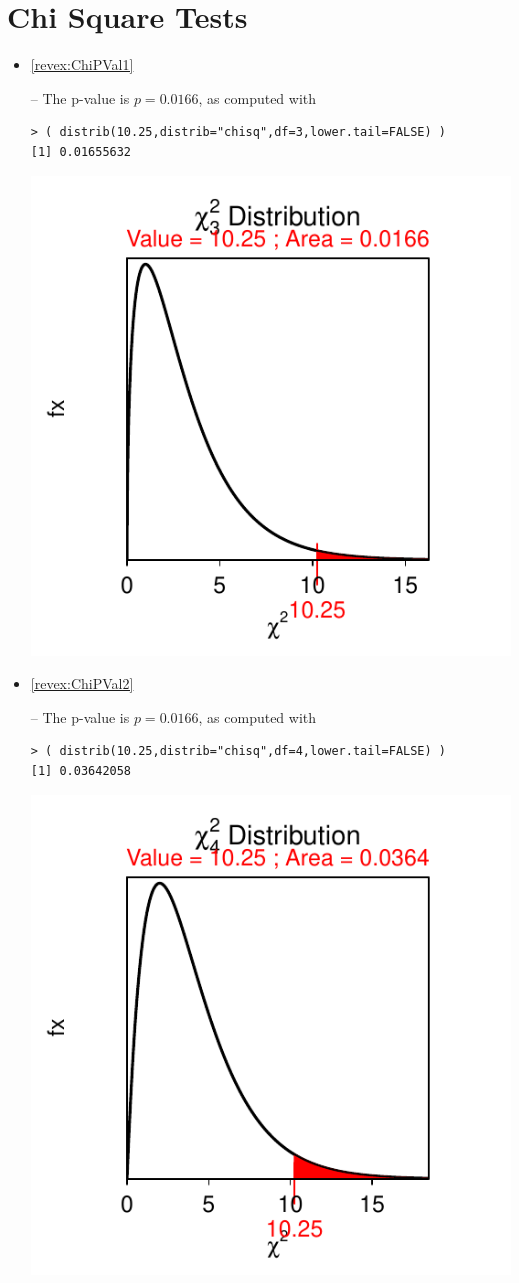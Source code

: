\documentclass[10pt,openany]{book}\usepackage[]{graphicx}\usepackage[]{color}
\makeatletter
\newenvironment{kframe}{%
 \def\at@end@of@kframe{}%
 \ifinner\ifhmode%
  \def\at@end@of@kframe{\end{minipage}}%
  \begin{minipage}{\columnwidth}%
 \fi\fi%
 \def\FrameCommand##1{\hskip\@totalleftmargin \hskip-\fboxsep
 \colorbox{shadecolor}{##1}\hskip-\fboxsep
     \hskip-\linewidth \hskip-\@totalleftmargin \hskip\columnwidth}%
 \MakeFramed {\advance\hsize-\width
   \@totalleftmargin\z@ \linewidth\hsize
   \@setminipage}}%
 {\par\unskip\endMakeFramed%
 \at@end@of@kframe}
\newenvironment{knitrout}{}{} %
\makeatother
\begin{document}
\section*{Chi Square Tests}
\begin{itemize}
  \item \hypertarget{ans:ChiPVal1}{\ref{revex:ChiPVal1}} -- The p-value is $p=0.0166$, as computed with
\begin{knitrout}
\color{fgcolor}\begin{kframe}
\begin{verbatim}
> ( distrib(10.25,distrib="chisq",df=3,lower.tail=FALSE) )
[1] 0.01655632
\end{verbatim}
\end{kframe}

{\centering \includegraphics[width=.4\linewidth]{Figs/unnamed-chunk-396-1} 

}



\end{knitrout}
  \item \hypertarget{ans:ChiPVal2}{\ref{revex:ChiPVal2}} -- The p-value is $p=0.0166$, as computed with
\begin{knitrout}
\color{fgcolor}\begin{kframe}
\begin{verbatim}
> ( distrib(10.25,distrib="chisq",df=4,lower.tail=FALSE) )
[1] 0.03642058
\end{verbatim}
\end{kframe}

{\centering \includegraphics[width=.4\linewidth]{Figs/unnamed-chunk-397-1} 

}
\end{knitrout}
\end{itemize}
\end{document}
